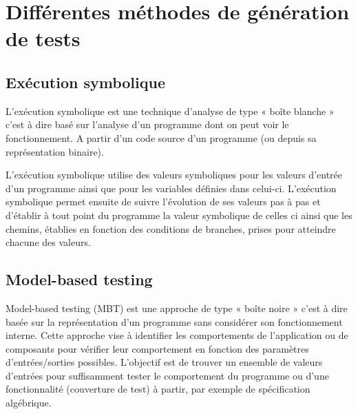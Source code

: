 
\chapter{Différentes méthodes de génération de tests} %

\label{Chapter1} %


\newcommand{\keyword}[1]{\textbf{#1}}
\newcommand{\tabhead}[1]{\textbf{#1}}
\newcommand{\code}[1]{\texttt{#1}}
\newcommand{\file}[1]{\texttt{\bfseries#1}}
\newcommand{\option}[1]{\texttt{\itshape#1}}


\section{Exécution symbolique}

L'exécution symbolique est une technique d'analyse de type « boîte blanche » c'est à dire basé sur l'analyse d'un programme dont on peut voir le fonctionnement.
A partir d'un code source d'un programme (ou depuis sa représentation binaire).

L'exécution symbolique utilise des valeurs symboliques pour les valeurs d'entrée d'un programme ainsi que pour les variables définies dans celui-ci. 
L'exécution symbolique permet ensuite de suivre l'évolution de ses valeurs pas à pas et d'établir à tout point du programme la valeur symbolique de celles ci ainsi que les chemins, établies en fonction des conditions de branches, prises pour atteindre chacune des valeurs. 


\section{Model-based testing}

Model-based testing (MBT) est une approche de type « boîte noire » c'est à dire basée sur la représentation d'un programme sans considérer son fonctionnement interne. Cette approche vise à identifier les comportements de l'application ou de composants pour vérifier leur comportement en fonction des paramètres d'entrées/sorties possibles.
\cite{shadow}
\cite{EFSM}
L'objectif est de trouver un ensemble de valeurs d'entrées pour suffisamment tester le comportement du programme ou d'une fonctionnalité (couverture de test) à partir, par exemple de spécification algébrique\cite{testsurvey}.

